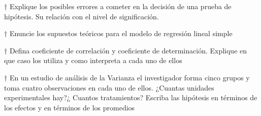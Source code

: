 \documentclass[10pt,a4paper]{article}
\begin{document}
$\dagger$  Explique los posibles errores a cometer en la decisión de una prueba de hipótesis. Su relación con el nivel de significación.

$\dagger$  Enuncie los supuestos teóricos para el modelo de regresión lineal simple

$\dagger$  Defina coeficiente de correlación y coeficiente de determinación. Explique en que caso los utiliza y como interpreta a cada uno de ellos

$\dagger$  En un estudio de análisis de la Varianza el investigador forma cinco grupos y toma cuatro observaciones en cada uno de ellos. ¿Cuantas unidades experimentales hay?¿ Cuantos tratamientos? Escriba las hipótesis en términos de los efectos y en términos de los promedios 
\end{document}
